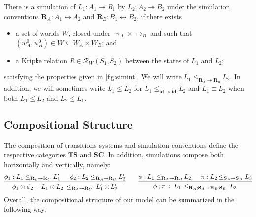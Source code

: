 \documentclass[acmsmall,screen,review,anonymous]{acmart}
\renewcommand{\preceq}{\le}
\newcommand{\intl}[1]{#1^0}
\newcommand{\idsc}{\mathbf{id}} %
\begin{document}
\begin{definition}
There is a simulation
of $L_1 : A_1 \twoheadrightarrow B_1$
by $L_2 : A_2 \twoheadrightarrow B_2$
under the simulation conventions
$\mathbf{R}_A : A_1 \leftrightarrow A_2$ and
$\mathbf{R}_B : B_1 \leftrightarrow B_2$,
if there exists
\begin{itemize}
\item a set of worlds $W$,
closed under ${\leadsto_A} \times {\mapsto_B}$ and
such that
$(\intl{w}_A, \intl{w}_B) \in W \subseteq W_A \times W_B$;
and
\item
a Kripke relation $R \in \mathcal{R}_W(S_1, S_2)$
between the states of $L_1$ and $L_2$;
\end{itemize}
satisfying the properties given in
\autoref{fig:simint}.
We will write
$L_1 \preceq_{\mathbf{R}_A \twoheadrightarrow \mathbf{R}_B} L_2$.
In addition,
we will sometimes write
$L_1 \le L_2$ for $L_1 \le_{\idsc \twoheadrightarrow \idsc} L_2$ and
$L_1 \equiv L_2$ when both $L_1 \le L_2$ and $L_2 \le L_1$.
\end{definition}


\subsection{Compositional Structure} \label{sec:base:double} %

The composition of transitions systems and simulation conventions
define the respective categories $\mathbf{TS}$ and $\mathbf{SC}$.
In addition,
simulations compose both horizontally and vertically,
namely:
\[
  \begin{prooftree}
    \hypo{
      \phi_1 :
      L_1
      \preceq_{\mathbf{R}_B \twoheadrightarrow \mathbf{R}_C}
      L_1'}
    \hypo{
      \phi_2 :
      L_2
      \preceq_{\mathbf{R}_A \twoheadrightarrow \mathbf{R}_B}
      L_2'}
    \infer2{
      \phi_1 \odot \phi_2 \::\:
      L_1 \odot L_2
      \: \preceq_{\mathbf{R}_A \twoheadrightarrow \mathbf{R}_C} \:
      L_1' \odot L_2'}
  \end{prooftree}
  \qquad
  \begin{prooftree}
    \hypo{\phi : L_1
      \preceq_{\mathbf{R}_A \twoheadrightarrow \mathbf{R}_B}
      L_2}
    \hypo{\pi : L_2
      \preceq_{\mathbf{S}_A \twoheadrightarrow \mathbf{S}_B}
      L_3}
    \infer2{
      \phi \mathbin; \pi \::\:
      L_1 \:
      \preceq_{\mathbf{R}_A \mathbin; \mathbf{S}_A \twoheadrightarrow
	   \mathbf{R}_B \mathbin; \mathbf{S}_B}
      \: L_3}
  \end{prooftree}
\]
Overall,
the compositional structure of our model
can be summarized in the following way.
\end{document}
